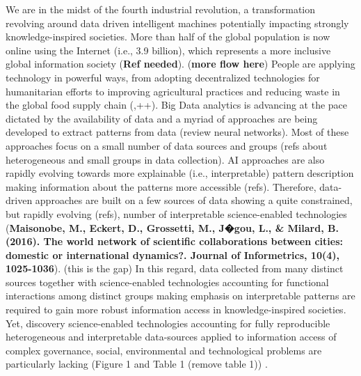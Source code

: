 \documentclass[11pt, a4paper]{article} %
\begin{document}
We are in the midst of the fourth industrial revolution, a
transformation revolving around data driven intelligent machines
potentially impacting strongly knowledge-inspired societies. More than
half of the global population is now online using the Internet (i.e.,
3.9 billion), which represents a more inclusive global information
society ({\bf Ref needed}). ({\bf more flow here}) People are applying
technology in powerful ways, from adopting decentralized technologies
for humanitarian efforts to improving agricultural practices and
reducing waste in the global food supply chain
(\citep{Wilson2018},++). Big Data analytics is advancing at the pace
dictated by the availability of data and a myriad of approaches are
being developed to extract patterns from data (review neural
networks). Most of these approaches focus on a small number of data
sources and groups (refs about heterogeneous and small groups in data
collection). AI approaches are also rapidly evolving towards more
explainable (i.e., interpretable) pattern description making
information about the patterns more accessible (refs). Therefore,
data-driven approaches are built on a few sources of data showing a
quite constrained, but rapidly evolving (refs), number of
interpretable science-enabled technologies ({\bf Maisonobe, M.,
  Eckert, D., Grossetti, M., J�gou, L., & Milard, B. (2016). The world
  network of scientific collaborations between cities: domestic or
  international dynamics?. Journal of Informetrics, 10(4),
  1025-1036}). (this is the gap) In this regard, data collected from
many distinct sources together with science-enabled technologies
accounting for functional interactions among distinct groups making
emphasis on interpretable patterns are required to gain more robust
information access in knowledge-inspired societies. Yet, discovery
science-enabled technologies accounting for fully reproducible
heterogeneous and interpretable data-sources applied to information
access of complex governance, social, environmental and technological
problems are particularly lacking (Figure 1 and Table 1 (remove table
1)) \citep{Mastrangelo2019}.
\end{document}
